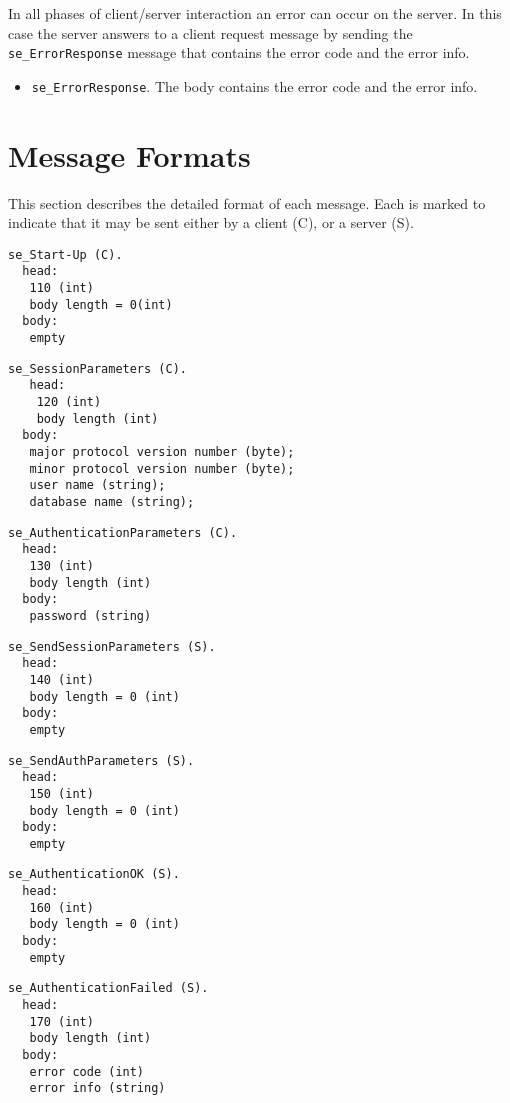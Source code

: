 \documentclass[a4paper,12pt]{article}
\begin{document}
In all phases of client/server interaction an error can occur on the server. In this case the server answers to a client request message by sending the \verb!se_ErrorResponse! message that contains the error code and the error info.

\begin{itemize}
\item \verb!se_ErrorResponse!. The body contains the error code and the error info.
\end{itemize}

\newpage

\section{Message Formats}
\label{sec:MessageFormats}
This section describes the detailed format of each message. Each is marked to indicate that it may be sent either 
by a client (C), or a server (S).

\begin{verbatim}
se_Start-Up (C).
  head:
   110 (int)
   body length = 0(int)
  body:
   empty
\end{verbatim}

\begin{verbatim}
se_SessionParameters (C).
   head:
	120 (int)
	body length (int)
  body:
   major protocol version number (byte);
   minor protocol version number (byte);
   user name (string);
   database name (string);
\end{verbatim}

\begin{verbatim}
se_AuthenticationParameters (C).
  head:
   130 (int)
   body length (int)
  body:
   password (string)
\end{verbatim}

\begin{verbatim}
se_SendSessionParameters (S).
  head:
   140 (int)
   body length = 0 (int)
  body:
   empty
\end{verbatim}

\begin{verbatim}
se_SendAuthParameters (S).
  head:
   150 (int)
   body length = 0 (int)
  body:
   empty
\end{verbatim}

\begin{verbatim}
se_AuthenticationOK (S).
  head:
   160 (int)
   body length = 0 (int)
  body:
   empty
\end{verbatim}

\begin{verbatim}
se_AuthenticationFailed (S).
  head:
   170 (int)
   body length (int)
  body:
   error code (int)
   error info (string)
\end{verbatim}
\end{document}
